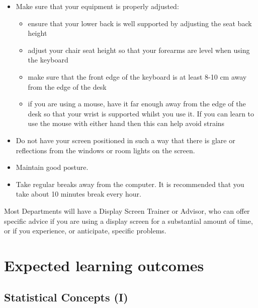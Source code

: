 \documentclass[]{book}
\begin{document}
\begin{itemize}
\item
  Make sure that your equipment is properly adjusted:

  \begin{itemize}
  \item
    ensure that your lower back is well supported by adjusting the seat
    back height
  \item
    adjust your chair seat height so that your forearms are level when
    using the keyboard
  \item
    make sure that the front edge of the keyboard is at least 8-10 cm
    away from the edge of the desk
  \item
    if you are using a mouse, have it far enough away from the edge of
    the desk so that your wrist is supported whilst you use it. If you
    can learn to use the mouse with either hand then this can help avoid
    strains
  \end{itemize}
\item
  Do not have your screen positioned in such a way that there is glare
  or reflections from the windows or room lights on the screen.
\item
  Maintain good posture.
\item
  Take regular breaks away from the computer. It is recommended that you
  take about 10 minutes break every hour.
\end{itemize}

Most Departments will have a Display Screen Trainer or Advisor, who can
offer specific advice if you are using a display screen for a
substantial amount of time, or if you experience, or anticipate,
specific problems.

\hypertarget{expected-learning-outcomes}{\chapter{Expected learning
outcomes}\label{expected-learning-outcomes}}

\section{Statistical Concepts (I)}\label{statistical-concepts-i}
\end{document}
